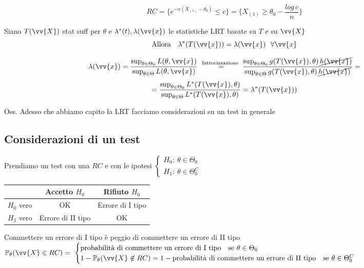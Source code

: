 \[
RC= \{ e^{-n(X_{(1)}-\theta_0)} \le c \} = \{ X_{(1)}\ge \theta_0 - \frac{log\, c}{n} \}
\]

\phantom{}

\begin{teo}
Siano $T(\vv{X})$ stat suff per $\theta$ e $\lambda^*(t), \lambda(\vv{x})$ le statistiche LRT basate su $T$ e su $\vv{X}$
\[\text{Allora } \ \ \lambda^*(T(\vv{x}))=\lambda(\vv{x}) \ \ \forall \vv{x}\]
\end{teo}

\begin{Dim}
\[
\lambda(\vv{x}) = \frac{\sup_{\theta\in\Theta_0} L(\theta,\vv{x})}{\sup_{\theta\in\Theta}L(\theta,\vv{x})} \ \overset{\text{fattorizzazione }}{ = } \frac{\sup_{\theta\in\Theta_0} g(T(\vv{x}), \theta)\,\cancel{h(\vv{x})}}{\sup_{\theta\in\Theta}g(T(\vv{x}), \theta)\,\cancel{h(\vv{x})}} = \]
\[=\frac{\sup_{\theta\in\Theta_0} L^*(T(\vv{x}),\theta)}{\sup_{\theta\in\Theta}L^*(T(\vv{x}),\theta)} = \lambda^*(T(\vv{x}))
\]
\end{Dim}

\phantom{}


Oss. Adesso che abbiamo capito la LRT facciamo considerazioni su un test in generale

\subsection{Considerazioni di un test}
Prendiamo un test con una $RC$ e con le ipotesi $\begin{cases}
    H_0 : \ \theta\in \Theta_0\\
    H_1 : \ \theta\in \Theta_0^C
\end{cases}$\\ 

\begin{center}
\begin{tabular}{|c|c|c|}
\hline
 & Accetto $H_0$ & Rifiuto $H_0$\\
\hline
 $H_0$ vero & OK & Errore di I tipo\\
\hline
$H_1$ vero & Errore di II tipo & OK \\
\hline
\end{tabular}
\end{center}

Commettere un errore di I tipo è peggio di commettere un errore di II tipo\\


$\PP_{\theta}(\vv{X}\in RC) = \ \begin{cases}
    \text{probabilità di commettere un errore di I tipo \ \ se } \theta\in \Theta_0\\
    1-\PP_{\theta}(\vv{X}\not\in RC) =  1- \text{probabilità di commettere un errore di II tipo \ \ se } \theta\in \Theta_0^C
\end{cases}$\\ \\


